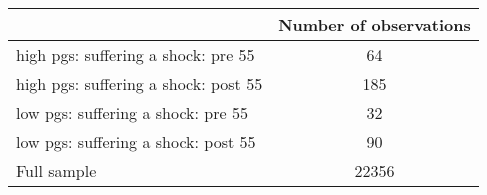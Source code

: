 % 
\begin{tabular}{lc}
  \toprule
 & Number of observations \\ 
  \midrule
high pgs: suffering a shock: pre 55 &  64 \\ 
   \midrule
high pgs: suffering a shock: post 55 & 185 \\ 
  low pgs: suffering a shock: pre 55 &  32 \\ 
  low pgs: suffering a shock: post 55 &  90 \\ 
  Full sample & 22356 \\ 
   \bottomrule
\end{tabular}
